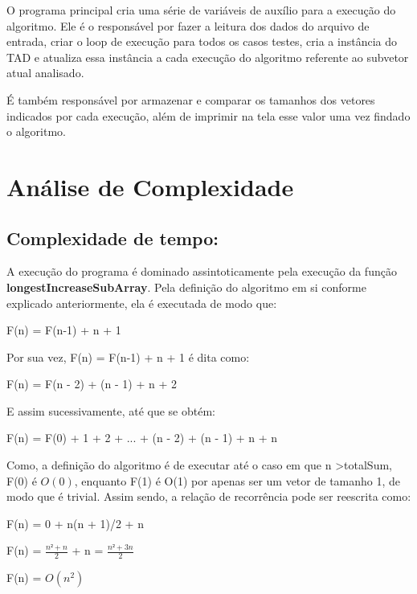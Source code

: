 \documentclass[12pt]{article}
\begin{document}
    \par O programa principal cria uma série de variáveis de auxílio para a execução do algoritmo. Ele é o responsável por fazer a leitura dos dados do arquivo de entrada, criar o loop de execução para todos os casos testes, cria a instância do TAD e atualiza essa instância a cada execução do algoritmo referente ao subvetor atual analisado.
    \par É também responsável por armazenar e comparar os tamanhos dos vetores indicados por cada execução, além de imprimir na tela esse valor uma vez findado o algoritmo.



\section{Análise de Complexidade}
\subsection {Complexidade de tempo:}
    \par A execução do programa é dominado assintoticamente pela execução da função \textbf{longestIncreaseSubArray}. Pela definição do algoritmo em si conforme explicado anteriormente, ela é executada de modo que:
    \par {\begin{center} F(n) = F(n-1) + n + 1\end{center}}
    \par Por sua vez, F(n) = F(n-1) + n + 1 é dita como:
    \par {\begin{center} F(n) = F(n - 2) + (n - 1) + n + 2 \end{center}}
    \par E assim sucessivamente, até que se obtém:
    {\begin{center}
        F(n) = F(0) + 1 + 2 + ... + (n - 2) + (n - 1) + n + n
    \end{center}}
    \par Como, a definição do algoritmo é de executar até o caso em que n \textgreater\space totalSum, F(0) é $O(0)$, enquanto F(1) é O(1) por apenas ser um vetor de tamanho 1, de modo que é trivial. Assim sendo, a relação de recorrência pode ser reescrita como:
    {\begin{center}
    F(n) = 0 + n(n + 1)/2 + n
\par F(n) = $\frac{n² + n}{2}$ + n = $\frac{n² + 3n}{2}$
\par F(n) = $O(n^2)$
    \end{center}}
    
\end{document}
